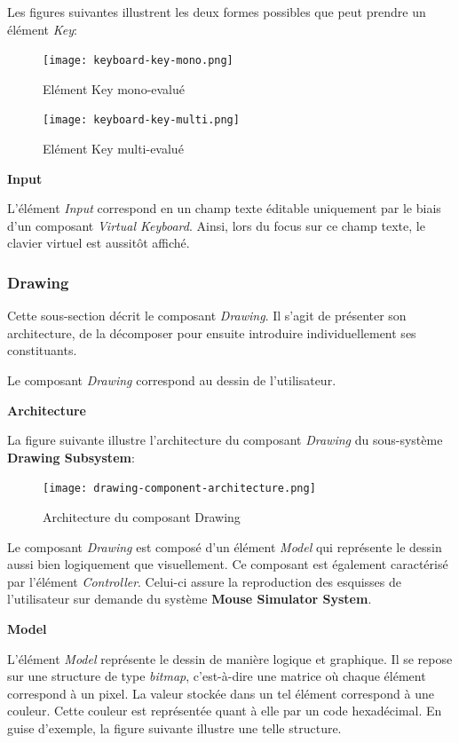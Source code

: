 \documentclass[11pt,a4paper,oldfontcommands]{memoir}
\begin{document}
Les figures suivantes illustrent les deux formes possibles que peut prendre un élément \textit{Key}:

\begin{figure}[H]
\centering
\texttt{[image: keyboard-key-mono.png]}
\caption{Elément Key mono-evalué}
\end{figure}

\begin{figure}[H]
\centering
\texttt{[image: keyboard-key-multi.png]}
\caption{Elément Key multi-evalué}
\end{figure}

\textbf{Input}

L'élément \textit{Input} correspond en un champ texte éditable uniquement par le biais d'un composant \textit{Virtual Keyboard}. Ainsi, lors du focus sur ce champ texte, le clavier virtuel est aussitôt affiché.

\subsubsection{Drawing}

Cette sous-section décrit le composant \textit{Drawing}. Il s'agit de présenter son architecture, de la décomposer pour ensuite introduire individuellement ses constituants.

Le composant \textit{Drawing} correspond au dessin de l'utilisateur.

\newpage

\textbf{Architecture}

La figure suivante illustre l'architecture du composant \textit{Drawing} du sous-système \textbf{Drawing Subsystem}:

\begin{figure}[H]
\centering
\texttt{[image: drawing-component-architecture.png]}
\caption{Architecture du composant Drawing}
\end{figure}

Le composant \textit{Drawing} est composé d'un élément \textit{Model} qui représente le dessin aussi bien logiquement que visuellement. Ce composant est également caractérisé par l'élément \textit{Controller}. Celui-ci assure la reproduction des esquisses de l'utilisateur sur demande du système \textbf{Mouse Simulator System}.

\textbf{Model}

L'élément \textit{Model} représente le dessin de manière logique et graphique. Il se repose sur une structure de type \textit{bitmap}, c’est-à-dire une matrice où chaque élément correspond à un pixel. La valeur stockée dans un tel élément correspond à une couleur. Cette couleur est représentée quant à elle par un code hexadécimal. En guise d’exemple, la figure suivante illustre une telle structure.
\end{document}
